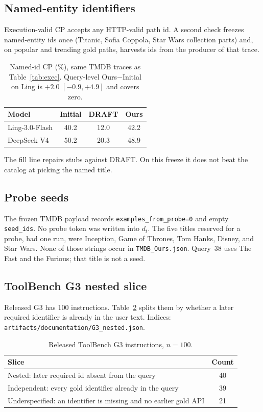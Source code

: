 \documentclass[11pt,a4paper]{article}
\begin{document}
\subsection{Named-entity identifiers}
\label{app:gold-id}

Execution-valid CP accepts any HTTP-valid path id. A second check freezes named-entity ids once (Titanic, Sofia Coppola, Star Wars collection parts) and, on popular and trending gold paths, harvests ids from the producer of that trace.

\begin{table}[H]
\centering
\caption{Named-id CP (\%), same TMDB traces as Table~\ref{tab:exec}. Query-level Ours$-$Initial on Ling is $+2.0$ $[-0.9,+4.9]$ and covers zero.}
\label{tab:named-id}
\small
\begin{tabular}{lccc}
\toprule
Model & Initial & DRAFT & Ours \\
\midrule
Ling-3.0-Flash & 40.2 & 12.0 & 42.2 \\
DeepSeek V4 & 50.2 & 20.3 & 48.9 \\
\bottomrule
\end{tabular}
\end{table}

The fill line repairs stubs against DRAFT. On this freeze it does not beat the catalog at picking the named title.

\subsection{Probe seeds}
\label{app:probe}

The frozen TMDB payload records \texttt{examples\_from\_probe=0} and empty \texttt{seed\_ids}. No probe token was written into $d_t$. The five titles reserved for a probe, had one run, were Inception, Game of Thrones, Tom Hanks, Disney, and Star Wars. None of those strings occur in \texttt{TMDB\_Ours.json}. Query~38 uses The Fast and the Furious; that title is not a seed.

\subsection{ToolBench G3 nested slice}
\label{app:g3}

Released G3 has 100 instructions. Table~\ref{tab:g3} splits them by whether a later required identifier is already in the user text. Indices: \texttt{artifacts/documentation/G3\_nested.json}.

\begin{table}[H]
\centering
\caption{Released ToolBench G3 instructions, $n{=}100$.}
\label{tab:g3}
\small
\begin{tabular}{lc}
\toprule
Slice & Count \\
\midrule
Nested: later required id absent from the query & 40 \\
Independent: every gold identifier already in the query & 39 \\
Underspecified: an identifier is missing and no earlier gold API & 21 \\
\bottomrule
\end{tabular}
\end{table}
\end{document}
